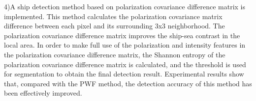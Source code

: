 \begin{eabstract}
  4)A ship detection method based on polarization covariance difference matrix is implemented.  This method calculates the polarization covariance matrix 
  difference between each pixel and its surrounding 3x3 neighborhood. The polarization covariance difference matrix improves
  the ship-sea contrast in the local area.  In order to make full use of the polarization and intensity features 
  in the polarization covariance difference matrix, the Shannon entropy of the polarization covariance
  difference matrix is ​​calculated, and the threshold is used for segmentation to obtain the final detection result.  
  Experimental results show that, compared with the PWF method, the detection accuracy of this method has been effectively improved.
\end{eabstract}

